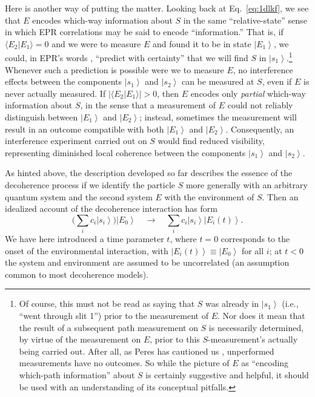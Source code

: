 \documentclass[aps,pra,reprint,amsmath,amssymb,showpacs,nofootinbib,floatfix,onecolumn,12pt]{revtex4-1}
\newcommand{\ket}[1]{\left\vert{#1}\right\rangle}
\newcommand{\braket}[2]{\ensuremath{{\langle #1}|{#2 \rangle}}}
\providecommand{\abs}[1]{\left\lvert#1\right\rvert}
\begin{document}
Here is another way of putting the matter. Looking back at Eq.~\eqref{eq:1dlkf}, we see that $E$ encodes which-way information about $S$ in the same ``relative-state'' sense \cite{Everett:1957:rw} in which EPR correlations \cite{Einstein:1935:dr,Bell:1964:ep,Bell:1966:ph} may be said to encode ``information.'' That is, if $\braket{E_2}{E_1} = 0$ and we were to measure $E$ and found it to be in state $\ket{E_1}$, we could, in EPR's words \cite[p.~777]{Einstein:1935:dr}, ``predict with certainty'' that we will find $S$ in $\ket{s_1}$.\footnote{Of course, this must not be read as saying that $S$ was already in $\ket{s_1}$ (i.e., ``went through slit 1'') prior to the measurement of $E$. Nor does it mean that the result of a subsequent path measurement on $S$ is necessarily determined, by virtue of the measurement on $E$, prior to this $S$-measurement's actually being carried out. After all, as Peres has cautioned us \cite{Peres:1978:aa}, unperformed measurements have no outcomes. So while the picture of $E$ as ``encoding which-path information'' about $S$ is certainly suggestive and helpful, it should be used with an understanding of its conceptual pitfalls.} Whenever such a prediction is possible were we to measure $E$, no interference effects between the components $\ket{s_1}$ and $\ket{s_2}$ can be measured at $S$, even if $E$ is never actually measured. If $\abs{\braket{E_2}{E_1}} > 0$, then $E$ encodes only \emph{partial} which-way information about $S$, in the sense that a measurement of $E$ could not reliably distinguish between $\ket{E_1}$ and $\ket{E_2}$; instead, sometimes the measurement will result in an outcome compatible with both $\ket{E_1}$ and $\ket{E_2}$. Consequently, an interference experiment carried out on $S$ would find reduced visibility, representing diminished local coherence between the components $\ket{s_1}$ and $\ket{s_2}$.

As hinted above, the description developed so far describes the essence of the decoherence process if we identify the particle $S$ more generally with an arbitrary quantum system and the second system $E$ with the environment of $S$. Then an idealized account of the decoherence interaction has form 
%
\begin{equation}
\label{eq:d1}
\biggl( \sum_i c_i \ket{s_i} \biggr) \ket{E_0} \quad \longrightarrow \quad \sum_i c_i \ket{s_i} \ket{E_i(t)}.
\end{equation}
%
We have here introduced a time parameter $t$, where $t=0$ corresponds to the onset of the environmental interaction, with $\ket{E_i(t)} \equiv \ket{E_0}$ for all $i$; at $t<0$ the system and environment are assumed to be uncorrelated (an assumption common to most decoherence models). 
\end{document}

